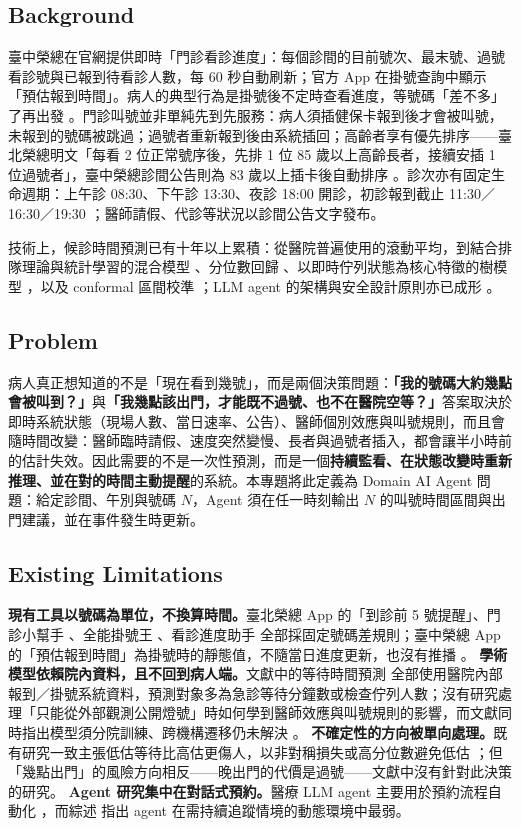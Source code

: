 \documentclass[11pt,twocolumn]{article}
\begin{document}
\subsection{Background}
臺中榮總在官網提供即時「門診看診進度」：每個診間的目前號次、最末號、過號看診號與已報到待看診人數，每 60 秒自動刷新；官方 App 在掛號查詢中顯示「預估報到時間」\cite{vghtcapp}。病人的典型行為是掛號後不定時查看進度，等號碼「差不多」了再出發 \cite{docbot2020}。門診叫號並非單純先到先服務：病人須插健保卡報到後才會被叫號，未報到的號碼被跳過；過號者重新報到後由系統插回；高齡者享有優先排序——臺北榮總明文「每看 2 位正常號序後，先排 1 位 85 歲以上高齡長者，接續安插 1 位過號者」\cite{vghtpe2025}，臺中榮總診間公告則為 83 歲以上插卡後自動排序 \cite{vghtcnotice}。診次亦有固定生命週期：上午診 08:30、下午診 13:30、夜診 18:00 開診，初診報到截止 11:30／16:30／19:30 \cite{vghtcreg}；醫師請假、代診等狀況以診間公告文字發布。

技術上，候診時間預測已有十年以上累積：從醫院普遍使用的滾動平均，到結合排隊理論與統計學習的混合模型 \cite{ang2016}、分位數回歸 \cite{pak2021}、以即時佇列狀態為核心特徵的樹模型 \cite{shin2024,guo2025,liu2026}，以及 conformal 區間校準 \cite{shahbazi2026}；LLM agent 的架構與安全設計原則亦已成形 \cite{chowa2026,hasan2026}。

\subsection{Problem}
病人真正想知道的不是「現在看到幾號」，而是兩個決策問題：\textbf{「我的號碼大約幾點會被叫到？」}與\textbf{「我幾點該出門，才能既不過號、也不在醫院空等？」}答案取決於即時系統狀態（現場人數、當日速率、公告）、醫師個別效應與叫號規則，而且會隨時間改變：醫師臨時請假、速度突然變慢、長者與過號者插入，都會讓半小時前的估計失效。因此需要的不是一次性預測，而是一個\textbf{持續監看、在狀態改變時重新推理、並在對的時間主動提醒}的系統。本專題將此定義為 Domain AI Agent 問題：給定診間、午別與號碼 $N$，Agent 須在任一時刻輸出 $N$ 的叫號時間區間與出門建議，並在事件發生時更新。

\subsection{Existing Limitations}
\textbf{現有工具以號碼為單位，不換算時間。}臺北榮總 App 的「到診前 5 號提醒」\cite{vghtpeapp}、門診小幫手 \cite{docbot2020}、全能掛號王 \cite{seedoctor}、看診進度助手 \cite{opdhelper} 全部採固定號碼差規則；臺中榮總 App 的「預估報到時間」為掛號時的靜態值，不隨當日進度更新，也沒有推播 \cite{vghtcapp}。
\textbf{學術模型依賴院內資料，且不回到病人端。}文獻中的等待時間預測 \cite{ang2016,pak2021,shin2024,guo2025,wang2025,liu2026} 全部使用醫院內部報到／掛號系統資料，預測對象多為急診等待分鐘數或檢查佇列人數；沒有研究處理「只能從外部觀測公開燈號」時如何學到醫師效應與叫號規則的影響，而文獻同時指出模型須分院訓練、跨機構遷移仍未解決 \cite{ang2016,shin2024,toffaha2025}。
\textbf{不確定性的方向被單向處理。}既有研究一致主張低估等待比高估更傷人，以非對稱損失或高分位數避免低估 \cite{pak2021,shin2024,zhang2023}；但「幾點出門」的風險方向相反——晚出門的代價是過號——文獻中沒有針對此決策的研究。
\textbf{Agent 研究集中在對話式預約。}醫療 LLM agent 主要用於預約流程自動化 \cite{hasan2026}，而綜述 \cite{chowa2026} 指出 agent 在需持續追蹤情境的動態環境中最弱。
\end{document}
